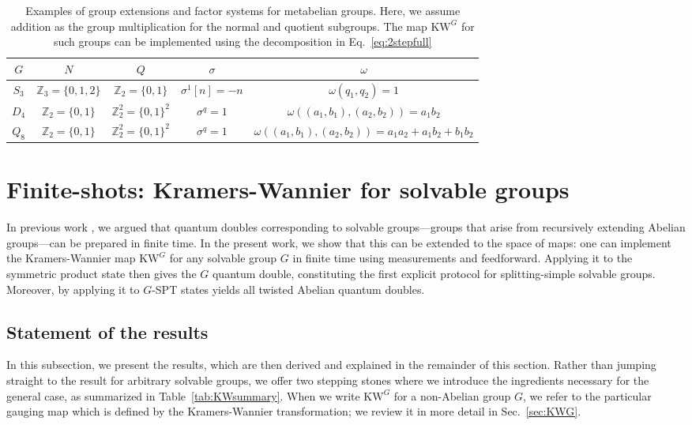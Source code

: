 \documentclass[nofootinbib,prx,twocolumn,showpacs,superscriptaddress,notitlepage,amsmath,amssymb]{revtex4-2}
\theoremstyle{definition}
\def\KW{\text{KW}}
\def\ZZ{\mathbb Z}
\begin{document}
\begin{table}[]
    \centering
     \begin{tabular}{|c|c|c| c|c|}
    \hline
    $G$ & $N$ & $Q$ & $\sigma$ & $\omega$ \\
    \hline
    $S_3$ & $\ZZ_3 = \{0,1,2\}$ &$\ZZ_2 = \{0,1\}$ & $\sigma^1[n]=-n$ & $\omega(q_1,q_2)=1$  \\
    \hline
    $D_4$ & $\ZZ_2 =\{0,1\} $ & $\ZZ_2^2 = \{0,1\}^{2}$ & $\sigma^q =1$ & $\omega((a_1,b_1),(a_2,b_2)) = a_1b_2$\\
    \hline
    $Q_8$ & $\ZZ_2= \{0,1\}$ & $\ZZ_2^2 = \{0,1\}^{2}$ & $\sigma^q =1$ & $\omega((a_1,b_1),(a_2,b_2)) = a_1a_2 +a_1b_2 + b_1b_2$ \\
    \hline
    \end{tabular}
    \caption{Examples of group extensions and factor systems for metabelian groups. Here, we assume addition as the group multiplication for the normal and quotient subgroups. The map $\KW^G$ for such groups can be implemented using the decomposition in Eq.~\eqref{eq:2stepfull}}
    \label{tab:metabelianexamples}
\end{table}




\section{Finite-shots: Kramers-Wannier for solvable groups}\label{sec:finiteshots}
In previous work \cite{measureSPT}, we argued that quantum doubles corresponding to solvable groups---groups that arise from recursively extending Abelian groups---can be prepared in finite time. In the present work, we show that this can be extended to the space of maps: one can implement the Kramers-Wannier map $\KW^G$ for any solvable group $G$ in finite time using measurements and feedforward. Applying it to the symmetric product state then gives the $G$ quantum double, constituting the first explicit protocol for splitting-simple solvable groups. Moreover, by applying it to $G$-SPT states yields all twisted Abelian quantum doubles.



\subsection{Statement of the results}

In this subsection, we present the results, which are then derived and explained in the remainder of this section.
Rather than jumping straight to the result for arbitrary solvable groups, we offer two stepping stones where we introduce the ingredients necessary for the general case, as summarized in Table~\ref{tab:KWsummary}. When we write $\KW^G$ for a non-Abelian group $G$, we refer to the particular gauging map which is defined by the Kramers-Wannier transformation; we review it in more detail in Sec.~\ref{sec:KWG}.
\end{document}
